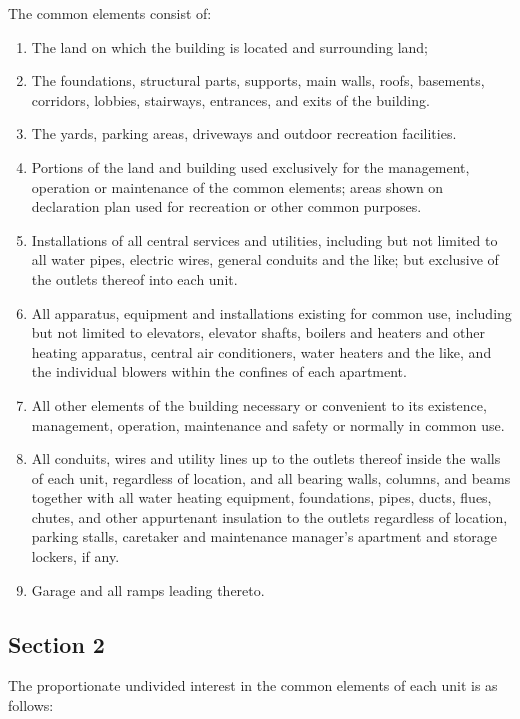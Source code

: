 \documentclass[
]{book}
\begin{document}
The common elements consist of:

\begin{enumerate}
\def\labelenumi{(\alph{enumi})}
\item
  The land on which the building is located and surrounding land;
\item
  The foundations, structural parts, supports, main walls, roofs, basements, corridors, lobbies, stairways, entrances, and exits of the building.
\item
  The yards, parking areas, driveways and outdoor recreation facilities.
\item
  Portions of the land and building used exclusively for the management, operation or maintenance of the common elements; areas shown on declaration plan used for recreation or other common purposes.
\item
  Installations of all central services and utilities, including but not limited to all water pipes, electric wires, general conduits and the like; but exclusive of the outlets thereof into each unit.
\item
  All apparatus, equipment and installations existing for common use, including but not limited to elevators, elevator shafts, boilers and heaters and other heating apparatus, central air conditioners, water heaters and the like, and the individual blowers within the confines of each apartment.
\item
  All other elements of the building necessary or convenient to its existence, management, operation, maintenance and safety or normally in common use.
\item
  All conduits, wires and utility lines up to the outlets thereof inside the walls of each unit, regardless of location, and all bearing walls, columns, and beams together with all water heating equipment, foundations, pipes, ducts, flues, chutes, and other appurtenant insulation to the outlets regardless of location, parking stalls, caretaker and maintenance manager's apartment and storage lockers, if any.
\item
  Garage and all ramps leading thereto.
\end{enumerate}

\hypertarget{section-2-1}{%
\subsection*{Section 2}\label{section-2-1}}

The proportionate undivided interest in the common elements of each unit is as follows:
\end{document}
